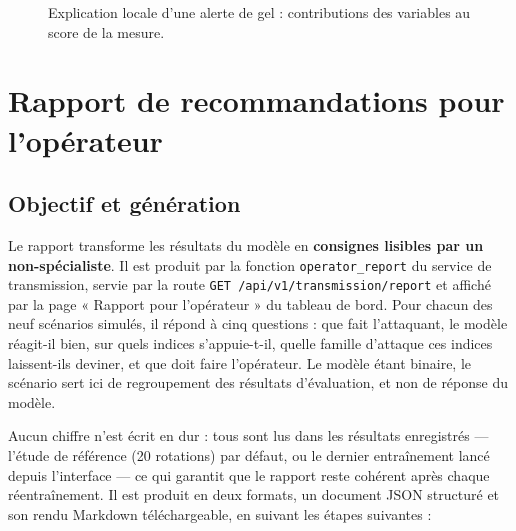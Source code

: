 \begin{figure}[H]
\centering
{}
\caption{Explication locale d'une alerte de gel : contributions des variables
au score de la mesure.}
\label{fig:expl_shap_local}
\end{figure}


\section{Rapport de recommandations pour l'opérateur}
\label{sec:expl_rapport}

\subsection{Objectif et génération}

Le rapport transforme les résultats du modèle en \textbf{consignes lisibles
par un non-spécialiste}. Il est produit par la fonction
\texttt{operator\_report} du service de transmission, servie par la route
\texttt{GET /api/v1/transmission/report} et affiché par la page « Rapport
pour l'opérateur » du tableau de bord. Pour chacun des neuf scénarios
simulés, il répond à cinq questions : que fait l'attaquant, le modèle réagit-il
bien, sur quels indices s'appuie-t-il, quelle famille d'attaque ces indices
laissent-ils deviner, et que doit faire l'opérateur. Le modèle étant
binaire, le scénario sert ici de regroupement des résultats d'évaluation, et
non de réponse du modèle.

Aucun chiffre n'est écrit en dur : tous sont lus dans les résultats
enregistrés — l'étude de référence (20 rotations) par défaut, ou le dernier
entraînement lancé depuis l'interface — ce qui garantit que le rapport
reste cohérent après chaque réentraînement. Il est produit en deux formats,
un document JSON structuré et son rendu Markdown téléchargeable, en suivant
les étapes suivantes :

